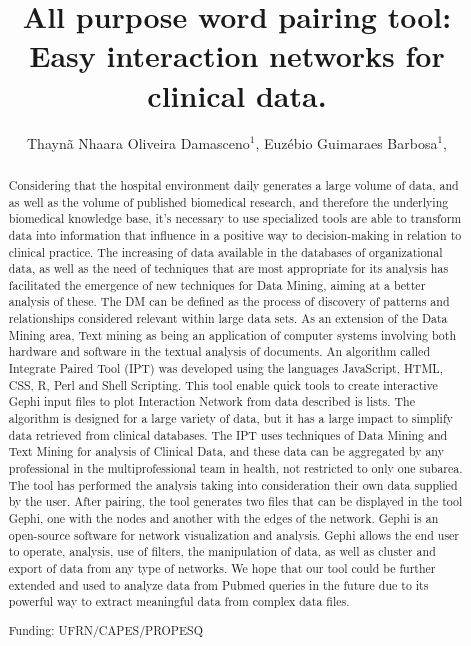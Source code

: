 \documentclass[twoside]{article}
\title{\vspace{-15mm}\fontsize{24pt}{10pt}\selectfont\textbf{ All purpose word pairing tool: Easy interaction networks for clinical data. }} %
\author{ Thaynã Nhaara Oliveira Damasceno$^{1}$, Euzébio Guimaraes Barbosa$^{1}$, }
\affil{ 1 UFRN

 }
\date{}
\begin{document}
  
  
  \maketitle %
  
  
  \thispagestyle{fancy} %
  
  
  \begin{abstract}
  Considering that the hospital environment daily generates a large volume of data, and as well as the volume of published biomedical research, and therefore the underlying biomedical knowledge base, it’s necessary to use specialized tools are able to transform data into information that influence in a positive way to decision-making in relation to clinical practice.
	The increasing of data available in the databases of organizational data, as well as the need of techniques that are most appropriate for its analysis has facilitated the emergence of new techniques for Data Mining, aiming at a better analysis of these. The DM can be defined as the process of discovery of patterns and relationships considered relevant within large data sets. As an extension of the Data Mining area, Text mining as being an application of computer systems involving both hardware and software in the textual analysis of documents. 
An algorithm called Integrate Paired Tool (IPT) was developed using the languages JavaScript, HTML, CSS, R, Perl and Shell Scripting. This tool enable quick tools to create interactive Gephi input files to plot Interaction Network from data described is lists. The algorithm is designed for a large variety of data, but it has a large impact to simplify data retrieved from clinical databases.  
	The IPT uses techniques of Data Mining and Text Mining for analysis of Clinical Data, and these data can be aggregated by any professional in the multiprofessional team in health, not restricted to only one subarea. The tool has performed the analysis taking into consideration their own data supplied by the user. 
After pairing, the tool generates two files that can be displayed in the tool Gephi, one with the nodes and another with the edges of the network. Gephi is an open-source software for network visualization and analysis. Gephi allows the end user to operate, analysis, use of filters, the manipulation of data, as well as cluster and export of data from any type of networks.
	We hope that our tool could be further extended and used to analyze data from Pubmed queries in the future due to its powerful way to extract meaningful data from complex data files.
  
  Funding: UFRN/CAPES/PROPESQ \\ 
  \end{abstract}
  
\end{document}
